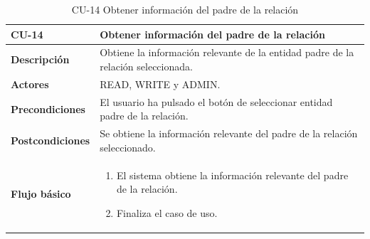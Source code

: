 \begin{table} [H]
    \centering
    \setlength{\leftmargini}{0.4cm}
	\resizebox{15cm}{!} { %
    \begin{tabular}{| m{3cm} | m{12cm} |}   
    \hline
	  \textbf{CU-14} & \textbf{Obtener información del padre de la relación} \\\hline
	  \textbf{Descripción} & Obtiene la información relevante de la entidad padre de la relación seleccionada. \\\hline
	  \textbf{Actores} & READ, WRITE y ADMIN. \\\hline
	  \textbf{Precondiciones} & El usuario ha pulsado el botón de seleccionar entidad padre de la relación. \\\hline
	  \textbf{Postcondiciones} & Se obtiene la información relevante del padre de la relación seleccionado. \\\hline
	  \textbf{Flujo básico} & 
		\begin{enumerate}
	  	\item El sistema obtiene la información relevante del padre de la relación.
		\item Finaliza el caso de uso.				
	  \end{enumerate} 	  	  
	  \\\hline
    \end{tabular}
    } %
    \caption{CU-14 Obtener información del padre de la relación}
    \label{tab:cu-obtener-informacion-padre}
\end{table}



